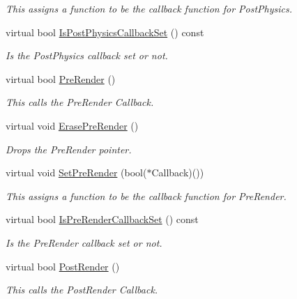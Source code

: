 \begin{DoxyCompactItemize}
\begin{DoxyCompactList}\small\item\em This assigns a function to be the callback function for PostPhysics. \item\end{DoxyCompactList}\item 
virtual bool \hyperlink{classphys_1_1CallBackManager_ad1e2131d792c6813caae4be4d5c4e5fb}{IsPostPhysicsCallbackSet} () const 
\begin{DoxyCompactList}\small\item\em Is the PostPhysics callback set or not. \item\end{DoxyCompactList}\item 
virtual bool \hyperlink{classphys_1_1CallBackManager_a244c88b8a06f68a4f4bcff6253bf6806}{PreRender} ()
\begin{DoxyCompactList}\small\item\em This calls the PreRender Callback. \item\end{DoxyCompactList}\item 
virtual void \hyperlink{classphys_1_1CallBackManager_adadf16f3f38398c9593646416ef18499}{ErasePreRender} ()
\begin{DoxyCompactList}\small\item\em Drops the PreRender pointer. \item\end{DoxyCompactList}\item 
virtual void \hyperlink{classphys_1_1CallBackManager_a1e060fd479413457a798ea3c6b2bcb4d}{SetPreRender} (bool($\ast$Callback)())
\begin{DoxyCompactList}\small\item\em This assigns a function to be the callback function for PreRender. \item\end{DoxyCompactList}\item 
virtual bool \hyperlink{classphys_1_1CallBackManager_a91017cc0aa4a04e74fd8f9ca0895b6f8}{IsPreRenderCallbackSet} () const 
\begin{DoxyCompactList}\small\item\em Is the PreRender callback set or not. \item\end{DoxyCompactList}\item 
virtual bool \hyperlink{classphys_1_1CallBackManager_aa1a1132e877d989ecea08a16ee4b3ac1}{PostRender} ()
\begin{DoxyCompactList}\small\item\em This calls the PostRender Callback. \item\end{DoxyCompactList}\item 

\end{DoxyCompactItemize}
